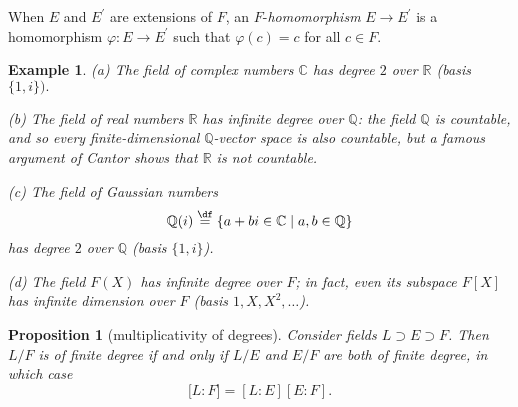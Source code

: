 \documentclass[a4paper,11pt,final,openany]{memoir}
\newtheorem{proposition}[X]{Proposition}
\newtheorem{example}[X]{Example}
\theoremstyle{nonumberplain}
\begin{document}
When $E$ and $E^{\prime}$ are extensions of $F$, an $F$-\emph{homomorphism}%
$E\rightarrow E^{\prime}$ is a homomorphism $\varphi\colon E\rightarrow
E^{\prime}$ such that $\varphi(c)=c$ for all $c\in F$.

\begin{example}
\label{ef9}(a) The field of complex numbers $\mathbb{C}$ has degree $2$ over
$\mathbb{R}$ (basis $\{1,i\}).$

(b) The field of real numbers $\mathbb{R}$ has infinite degree over
$\mathbb{Q}$: the field $\mathbb{Q}{}$ is countable, and so every
finite-dimensional $\mathbb{Q}{}$-vector space is also countable, but a famous
argument of Cantor shows that $\mathbb{R}{}$ is not countable.

(c) The field of \emph{Gaussian numbers}%
\[
\mathbb{Q}(i)\overset{\df}{=}\{a+bi\in\mathbb{C}\mid
a,b\in\mathbb{Q}\}
\]
has degree $2$ over $\mathbb{Q}$ (basis $\{1,i\}$).

(d) The field $F(X)$ has infinite degree over $F$; in fact, even its subspace
$F[X]$ has infinite dimension over $F$ (basis $1,X,X^{2},\ldots$).
\end{example}

\begin{proposition}
[multiplicativity of degrees]\label{ef10} Consider fields $L\supset E\supset
F$. Then $L/F$ is of finite degree if and only if $L/E$ and $E/F$ are both of
finite degree, in which case
\[
\lbrack L\colon F]=[L\colon E][E\colon F].
\]

\end{proposition}
\end{document}
